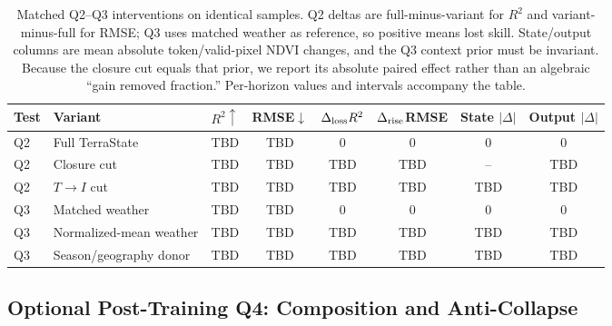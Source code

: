 \documentclass[letterpaper]{article} %
\begin{document}
\begin{table}[t]
\centering
\small
\setlength{\tabcolsep}{4pt}
\begin{tabular}{llcccccc}
\toprule
Test & Variant & $R^2\uparrow$ & RMSE$\downarrow$ &
$\Delta_{\rm loss}R^2$ & $\Delta_{\rm rise}$RMSE &
State $|\Delta|$ & Output $|\Delta|$\\
\midrule
Q2 & Full TerraState & TBD & TBD & 0 & 0 & 0 & 0\\
Q2 & Closure cut & TBD & TBD & TBD & TBD & -- & TBD\\
Q2 & $T\!\rightarrow\!I$ cut & TBD & TBD & TBD & TBD & TBD & TBD\\
\midrule
Q3 & Matched weather & TBD & TBD & 0 & 0 & 0 & 0\\
Q3 & Normalized-mean weather & TBD & TBD & TBD & TBD & TBD & TBD\\
Q3 & Season/geography donor & TBD & TBD & TBD & TBD & TBD & TBD\\
\bottomrule
\end{tabular}
\caption{Matched Q2--Q3 interventions on identical samples. Q2 deltas are
full-minus-variant for $R^2$ and variant-minus-full for RMSE; Q3 uses matched
weather as reference, so positive means lost skill. State/output columns are
mean absolute token/valid-pixel NDVI changes, and the Q3 context prior must be
invariant. Because the closure cut equals that prior, we report its absolute
paired effect rather than an algebraic ``gain removed fraction.'' Per-horizon
values and intervals accompany the table.}
\label{tab:cuts}
\end{table}


\subsection{Optional Post-Training Q4: Composition and Anti-Collapse}
\end{document}
